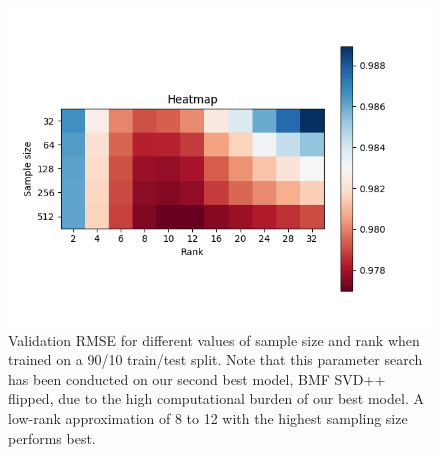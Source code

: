 \documentclass[10pt,conference,compsocconf]{IEEEtran}
\begin{document}
    \begin{figure}
        \includegraphics[width=\columnwidth]{figures/heatmap.png}
        \caption{Validation RMSE for different values of sample size and rank when trained on a 90/10 train/test split. Note that this parameter search has been conducted on our second best model, BMF SVD++ flipped, due to the high computational burden of our best model.
        A low-rank approximation of 8 to 12 with the highest sampling size performs best.}
        \label{fig:heatmap}
    \end{figure}
\end{document}
